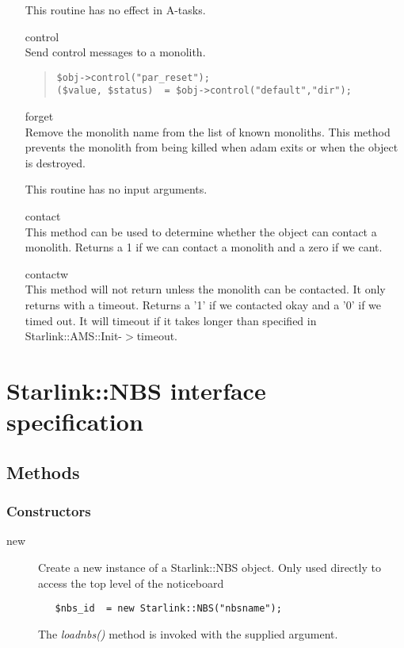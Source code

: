 \documentclass[twoside,11pt]{article}
\newenvironment{myquote}{\begin{quote}\begin{small}}{\end{small}\end{quote}}
\renewcommand{\_}{\texttt{\symbol{95}}}
\begin{document}
\begin{itemize}
This routine has no effect in A-tasks.

\item[control]%
%
\hfill\\
Send control messages to a monolith.
\begin{myquote}
\begin{verbatim}
$obj->control("par_reset");
($value, $status)  = $obj->control("default","dir");
\end{verbatim}
\end{myquote}

\item[forget]%
%
\hfill\\
Remove the monolith name from the list of known monoliths.
This method prevents the monolith from being killed when adam
exits or when the object is destroyed.

This routine has no input arguments. 

\item[contact]%
%
\hfill\\
This method can be used to determine whether the object can
contact a monolith. Returns a 1 if we can contact a monolith and
a zero if we cant.

\item[contactw]%
%
\hfill\\
This method will not return unless the monolith can be contacted.
It only returns with a timeout. Returns a '1' if we contacted okay
and a '0' if we timed out. It will timeout if it takes longer than
specified in Starlink::AMS::Init-$>$timeout.

\end{itemize}

\section{Starlink::NBS interface specification}

\subsection{Methods}

\subsubsection*{Constructors}%

\begin{description}

\item[new]%
%

Create a new instance of a Starlink::NBS object.
Only used directly to access the top level of the noticeboard
\begin{verbatim}
   $nbs_id  = new Starlink::NBS("nbsname");
\end{verbatim}

The {\em loadnbs()\/} method is invoked with the supplied argument.

\end{description}
\end{document}
